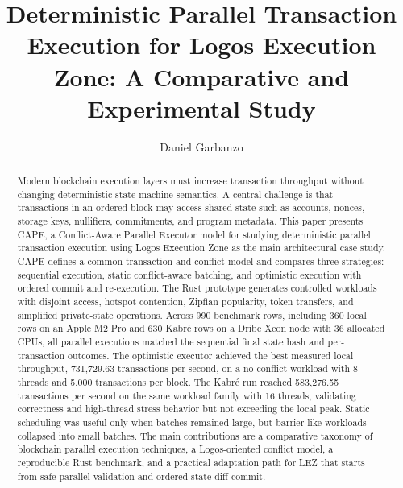 \documentclass[runningheads]{llncs}
\begin{document}
\title{Deterministic Parallel Transaction Execution for Logos Execution Zone: A Comparative and Experimental Study}

\author{Daniel Garbanzo}

\maketitle

\begin{abstract}
Modern blockchain execution layers must increase transaction throughput without changing deterministic state-machine semantics. A central challenge is that transactions in an ordered block may access shared state such as accounts, nonces, storage keys, nullifiers, commitments, and program metadata. This paper presents CAPE, a Conflict-Aware Parallel Executor model for studying deterministic parallel transaction execution using Logos Execution Zone as the main architectural case study. CAPE defines a common transaction and conflict model and compares three strategies: sequential execution, static conflict-aware batching, and optimistic execution with ordered commit and re-execution. The Rust prototype generates controlled workloads with disjoint access, hotspot contention, Zipfian popularity, token transfers, and simplified private-state operations. Across 990 benchmark rows, including 360 local rows on an Apple M2 Pro and 630 Kabré rows on a Dribe Xeon node with 36 allocated CPUs, all parallel executions matched the sequential final state hash and per-transaction outcomes. The optimistic executor achieved the best measured local throughput, 731,729.63 transactions per second, on a no-conflict workload with 8 threads and 5,000 transactions per block. The Kabré run reached 583,276.55 transactions per second on the same workload family with 16 threads, validating correctness and high-thread stress behavior but not exceeding the local peak. Static scheduling was useful only when batches remained large, but barrier-like workloads collapsed into small batches. The main contributions are a comparative taxonomy of blockchain parallel execution techniques, a Logos-oriented conflict model, a reproducible Rust benchmark, and a practical adaptation path for LEZ that starts from safe parallel validation and ordered state-diff commit.
\end{abstract}
\end{document}
